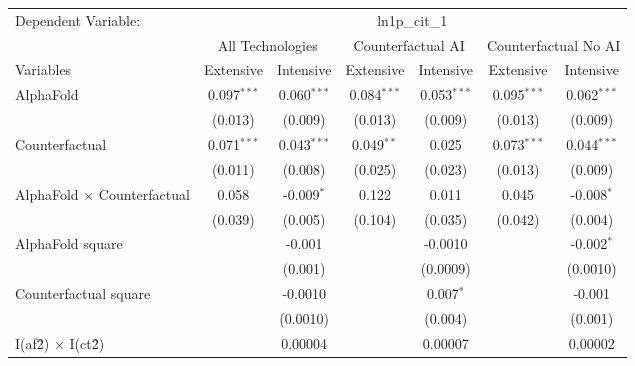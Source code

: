 \begingroup
\centering
\begin{tabular}{lcccccc}
   \tabularnewline \midrule \midrule
   Dependent Variable: & \multicolumn{6}{c}{ln1p\_cit\_1}\\
 & \multicolumn{2}{c}{All Technologies} & \multicolumn{2}{c}{Counterfactual AI} & \multicolumn{2}{c}{Counterfactual No AI} \\
\cmidrule(lr){1-1}\cmidrule(lr){2-3} \cmidrule(lr){4-5} \cmidrule(lr){6-7}
Variables & \multicolumn{1}{c}{Extensive} & \multicolumn{1}{c}{Intensive} & \multicolumn{1}{c}{Extensive} & \multicolumn{1}{c}{Intensive} & \multicolumn{1}{c}{Extensive} & \multicolumn{1}{c}{Intensive} \\
\cmidrule(lr){1-1}\cmidrule(lr){2-2} \cmidrule(lr){3-3} \cmidrule(lr){4-4} \cmidrule(lr){5-5} \cmidrule(lr){6-6} \cmidrule(lr){7-7}
   AlphaFold                          & 0.097$^{***}$ & 0.060$^{***}$ & 0.084$^{***}$ & 0.053$^{***}$ & 0.095$^{***}$ & 0.062$^{***}$\\   
                                      & (0.013)       & (0.009)       & (0.013)       & (0.009)       & (0.013)       & (0.009)\\   
   Counterfactual                     & 0.071$^{***}$ & 0.043$^{***}$ & 0.049$^{**}$  & 0.025         & 0.073$^{***}$ & 0.044$^{***}$\\   
                                      & (0.011)       & (0.008)       & (0.025)       & (0.023)       & (0.013)       & (0.009)\\   
   AlphaFold $\times$ Counterfactual  & 0.058         & -0.009$^{*}$  & 0.122         & 0.011         & 0.045         & -0.008$^{*}$\\   
                                      & (0.039)       & (0.005)       & (0.104)       & (0.035)       & (0.042)       & (0.004)\\   
   AlphaFold square                   &               & -0.001        &               & -0.0010       &               & -0.002$^{*}$\\   
                                      &               & (0.001)       &               & (0.0009)      &               & (0.0010)\\   
   Counterfactual square              &               & -0.0010       &               & 0.007$^{*}$   &               & -0.001\\   
                                      &               & (0.0010)      &               & (0.004)       &               & (0.001)\\   
   I(af\^2) $\times$ I(ct\^2)         &               & 0.00004       &               & 0.00007       &               & 0.00002\\   

\end{tabular}
